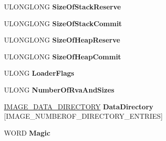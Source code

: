 \begin{DoxyCompactItemize}
U\+L\+O\+N\+G\+L\+O\+NG {\bfseries Size\+Of\+Stack\+Reserve}
\item 
\mbox{\label{struct___i_m_a_g_e___o_p_t_i_o_n_a_l___h_e_a_d_e_r64_ac80afcdeb0fc60d456350dced4e43b8a}} 
U\+L\+O\+N\+G\+L\+O\+NG {\bfseries Size\+Of\+Stack\+Commit}
\item 
\mbox{\label{struct___i_m_a_g_e___o_p_t_i_o_n_a_l___h_e_a_d_e_r64_ad225b09c6adc28538ee637885a9b4589}} 
U\+L\+O\+N\+G\+L\+O\+NG {\bfseries Size\+Of\+Heap\+Reserve}
\item 
\mbox{\label{struct___i_m_a_g_e___o_p_t_i_o_n_a_l___h_e_a_d_e_r64_a6b958f37e1630fa76f26dc60f003e7d8}} 
U\+L\+O\+N\+G\+L\+O\+NG {\bfseries Size\+Of\+Heap\+Commit}
\item 
\mbox{\label{struct___i_m_a_g_e___o_p_t_i_o_n_a_l___h_e_a_d_e_r64_a731102c663ae88402d8aa08359c44ab5}} 
U\+L\+O\+NG {\bfseries Loader\+Flags}
\item 
\mbox{\label{struct___i_m_a_g_e___o_p_t_i_o_n_a_l___h_e_a_d_e_r64_a8f05696ef5a2588164d4e502519d30b4}} 
U\+L\+O\+NG {\bfseries Number\+Of\+Rva\+And\+Sizes}
\item 
\mbox{\label{struct___i_m_a_g_e___o_p_t_i_o_n_a_l___h_e_a_d_e_r64_a0244e0e25ecf9a8a50463d1710e93d76}} 
\hyperlink{struct___i_m_a_g_e___d_a_t_a___d_i_r_e_c_t_o_r_y}{I\+M\+A\+G\+E\+\_\+\+D\+A\+T\+A\+\_\+\+D\+I\+R\+E\+C\+T\+O\+RY} {\bfseries Data\+Directory} \mbox{[}I\+M\+A\+G\+E\+\_\+\+N\+U\+M\+B\+E\+R\+O\+F\+\_\+\+D\+I\+R\+E\+C\+T\+O\+R\+Y\+\_\+\+E\+N\+T\+R\+I\+ES\mbox{]}
\item 
\mbox{\label{struct___i_m_a_g_e___o_p_t_i_o_n_a_l___h_e_a_d_e_r64_ab5c03adcb9ef3e8354bc2408e517c08d}} 
W\+O\+RD {\bfseries Magic}
\item 
\mbox{\label{struct___i_m_a_g_e___o_p_t_i_o_n_a_l___h_e_a_d_e_r64_a22167136c39f49c6622cb7d8986411db}} 

\end{DoxyCompactItemize}
